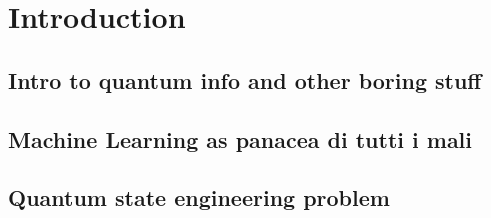 \chapter{Introduction}


\section{Intro to quantum info and other boring stuff}

\section{Machine Learning as panacea di tutti i mali}

\section{Quantum state engineering problem}

